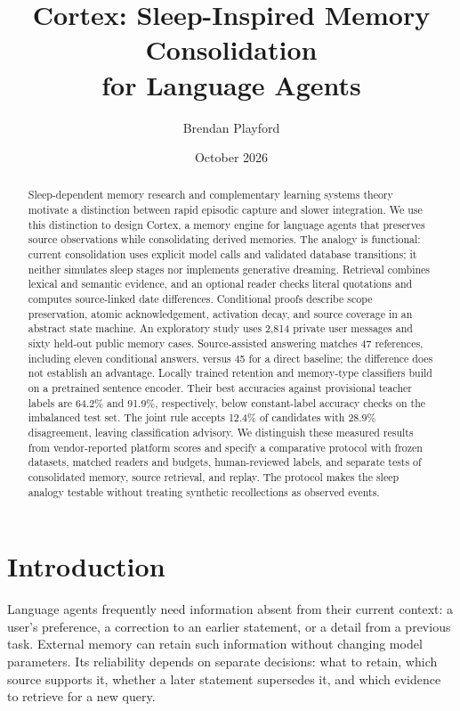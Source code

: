 \documentclass[11pt]{article}
\title{Cortex: Sleep-Inspired Memory Consolidation\\for Language Agents}
\author{Brendan Playford}
\date{October 2026}
\begin{document}
\maketitle
\begin{abstract}
Sleep-dependent memory research and complementary learning systems theory motivate a distinction between rapid episodic capture and slower integration. We use this distinction to design Cortex, a memory engine for language agents that preserves source observations while consolidating derived memories. The analogy is functional: current consolidation uses explicit model calls and validated database transitions; it neither simulates sleep stages nor implements generative dreaming. Retrieval combines lexical and semantic evidence, and an optional reader checks literal quotations and computes source-linked date differences. Conditional proofs describe scope preservation, atomic acknowledgement, activation decay, and source coverage in an abstract state machine. An exploratory study uses 2,814 private user messages and sixty held-out public memory cases. Source-assisted answering matches 47 references, including eleven conditional answers, versus 45 for a direct baseline; the difference does not establish an advantage. Locally trained retention and memory-type classifiers build on a pretrained sentence encoder. Their best accuracies against provisional teacher labels are 64.2\% and 91.9\%, respectively, below constant-label accuracy checks on the imbalanced test set. The joint rule accepts 12.4\% of candidates with 28.9\% disagreement, leaving classification advisory. We distinguish these measured results from vendor-reported platform scores and specify a comparative protocol with frozen datasets, matched readers and budgets, human-reviewed labels, and separate tests of consolidated memory, source retrieval, and replay. The protocol makes the sleep analogy testable without treating synthetic recollections as observed events.
\end{abstract}

\section{Introduction}
Language agents frequently need information absent from their current context: a user's preference, a correction to an earlier statement, or a detail from a previous task. External memory can retain such information without changing model parameters. Its reliability depends on separate decisions: what to retain, which source supports it, whether a later statement supersedes it, and which evidence to retrieve for a new query.
\end{document}
